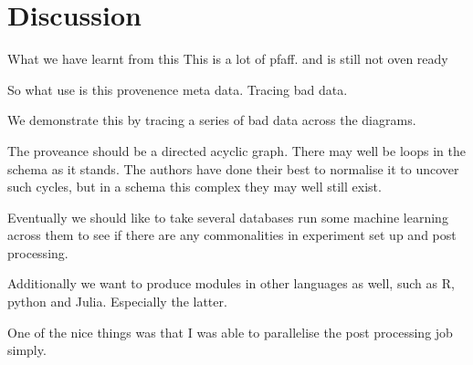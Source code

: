 \documentclass[runningheads]{llncs}
\begin{document}
\section{Discussion}

What we have learnt from this 
This is a lot of pfaff. and is still not oven ready

So what use is this provenence meta data. Tracing bad data. 

We demonstrate this by tracing a series of bad data across the diagrams.

The proveance should be a directed acyclic graph. There may well be loops in the schema as it stands. The authors have done their best to normalise it to uncover such cycles, but in a schema this complex they may well still exist.


Eventually we should like to take several databases run some machine learning across them to see if there are any commonalities in experiment set up and post processing.

Additionally we want to produce modules in other languages as well, such as R, python and Julia. Especially the latter. 

One of the nice things was that I was able to parallelise the post processing job simply.

%
%
%


%
\end{document}
